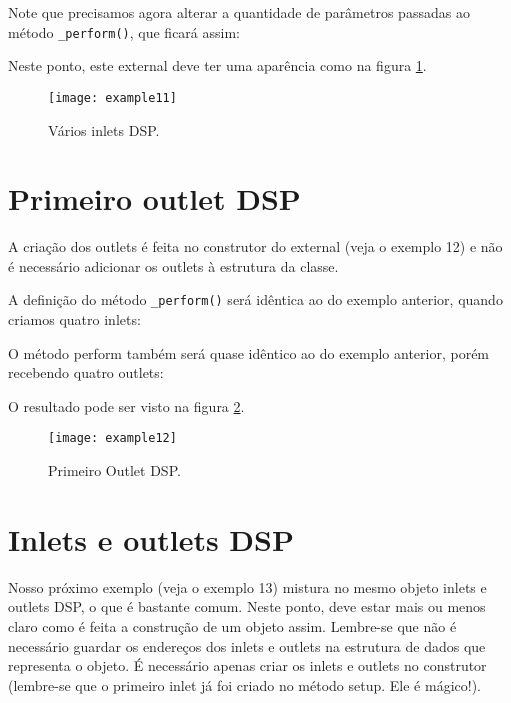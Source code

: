

Note que precisamos agora alterar a quantidade de parâmetros passadas ao método
\texttt{\_perform()}, que ficará assim:



Neste ponto, este external deve ter uma aparência como na figura
\ref{fig:inlets-dsp}.

\begin{figure}[h!]
\centering
\texttt{[image: example11]}
\caption{Vários inlets DSP.}
\label{fig:inlets-dsp}
\end{figure}

\section{Primeiro outlet DSP}

A criação dos outlets é feita no construtor do external (veja o exemplo 12) e
não é necessário adicionar os outlets à estrutura da classe.



A definição do método \texttt{\_perform()} será idêntica ao do exemplo
anterior, quando criamos quatro inlets:



O método perform também será quase idêntico ao do exemplo anterior, porém
recebendo quatro outlets:



O resultado pode ser visto na figura \ref{fig:primeiro-outlet}.

\begin{figure}[h!]
\centering
\texttt{[image: example12]}
\caption{Primeiro Outlet DSP.}
\label{fig:primeiro-outlet}
\end{figure}

\section{Inlets e outlets DSP}

Nosso próximo exemplo (veja o exemplo 13) mistura no mesmo objeto inlets e
outlets DSP, o que é bastante comum. Neste ponto, deve estar mais ou menos
claro como é feita a construção de um objeto assim. Lembre-se que não é
necessário guardar os endereços dos inlets e outlets na estrutura de dados que
representa o objeto. É necessário apenas criar os inlets e outlets no
construtor (lembre-se que o primeiro inlet já foi criado no método setup. Ele
é mágico!).

